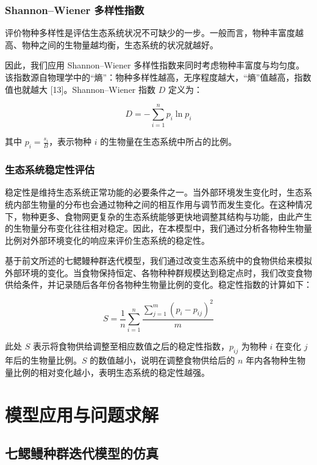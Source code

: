 \documentclass[11pt,a4paper]{ctexart}
\begin{document}
\subsubsection{Shannon--Wiener 多样性指数}

评价物种多样性是评估生态系统状况不可缺少的一步。一般而言，物种丰富度越高、物种之间的生物量越均衡，生态系统的状况就越好。

因此，我们应用 Shannon--Wiener 多样性指数来同时考虑物种丰富度与均匀度。该指数源自物理学中的“熵”：物种多样性越高，无序程度越大，“熵”值越高，指数值也就越大 [13]。Shannon--Wiener 指数 $D$ 定义为：

\begin{equation}
D=-\sum_{i=1}^{n}p_i\ln p_i
\end{equation}

其中 $p_i=\frac{s_i}{B}$，表示物种 $i$ 的生物量在生态系统中所占的比例。

\subsubsection{生态系统稳定性评估}

稳定性是维持生态系统正常功能的必要条件之一。当外部环境发生变化时，生态系统内部生物量的分布也会通过物种之间的相互作用与调节而发生变化。在这种情况下，物种更多、食物网更复杂的生态系统能够更快地调整其结构与功能，由此产生的生物量分布变化往往相对稳定。因此，在本模型中，我们通过分析各物种生物量比例对外部环境变化的响应来评价生态系统的稳定性。

基于前文所述的七鳃鳗种群迭代模型，我们通过改变生态系统中的食物供给来模拟外部环境的变化。当食物保持恒定、各物种种群规模达到稳定点时，我们改变食物供给条件，并记录随后各年份各物种生物量比例的变化。稳定性指数的计算如下：

\begin{equation}
S=\frac{1}{n}\sum_{i=1}^{n}\frac{\sum_{j=1}^{m}\left(p_i-p_{ij}\right)^2}{m}
\end{equation}

此处 $S$ 表示将食物供给调整至相应数值之后的稳定性指数，$p_{ij}$ 为物种 $i$ 在变化 $j$ 年后的生物量比例。$S$ 的数值越小，说明在调整食物供给后的 $n$ 年内各物种生物量比例的相对变化越小，表明生态系统的稳定性越强。
\section{模型应用与问题求解}

\subsection{七鳃鳗种群迭代模型的仿真}
\end{document}
